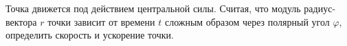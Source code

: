 Точка движется под действием центральной силы. Считая, что модуль радиус-вектора $r$ точки зависит от времени $t$ сложным
образом через полярный угол $\varphi$, определить скорость и ускорение точки.
